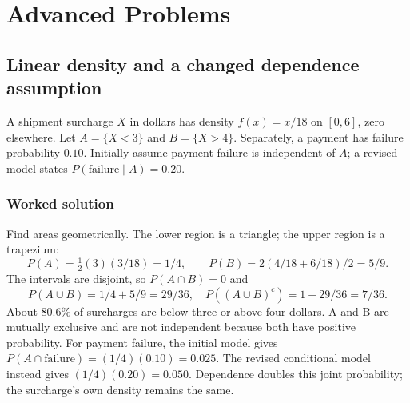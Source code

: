 \section{Advanced Problems}\label{sec:advanced}

\subsection{Linear density and a changed dependence assumption}\label{prob:sec:advanced0}
A shipment surcharge $X$ in dollars has density $f(x)=x/18$ on $[0,6]$, zero elsewhere. Let $A=\{X<3\}$ and $B=\{X>4\}$. Separately, a payment has failure probability $0.10$. Initially assume payment failure is independent of $A$; a revised model states $P(\text{failure}\mid A)=0.20$.
\subsubsection*{Worked solution}\label{sol:sec:advanced0}
Find areas geometrically. The lower region is a triangle; the upper region is a trapezium:
\[
P(A)=\tfrac12(3)(3/18)=1/4,\qquad
P(B)=2(4/18+6/18)/2=5/9.
\]
The intervals are disjoint, so $P(A\cap B)=0$ and
\[
P(A\cup B)=1/4+5/9=29/36,\quad
P((A\cup B)^c)=1-29/36=7/36.
\]
About $80.6\%$ of surcharges are below three or above four dollars. A and B are mutually exclusive and are not independent because both have positive probability.
For payment failure, the initial model gives $P(A\cap\text{failure})=(1/4)(0.10)=0.025$. The revised conditional model instead gives $(1/4)(0.20)=0.050$. Dependence doubles this joint probability; the surcharge's own density remains the same.



